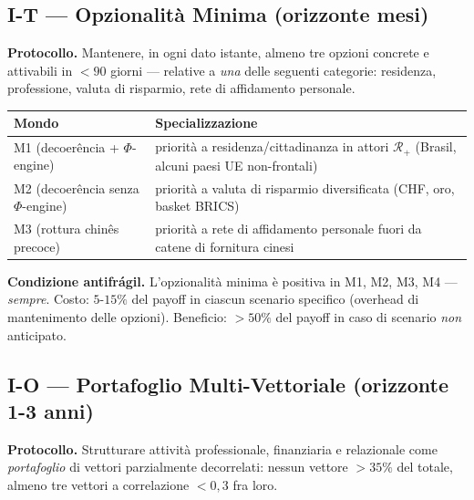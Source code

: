 \subsection{I-T --- Opzionalità Minima (orizzonte
mesi)}\label{i-t-opzionalituxe0-minima-orizzonte-mesi}

\Hypoth{} \textbf{Protocollo.} Mantenere, in ogni dato istante, almeno
tre opzioni concrete e attivabili in \(< 90\) giorni --- relative a
\emph{una} delle seguenti categorie: residenza, professione, valuta di
risparmio, rete di affidamento personale.

{\def\LTcaptype{none} %
{\small\begin{longtable}[]{@{}
  >{\raggedright\arraybackslash}p{}
  >{\raggedright\arraybackslash}p{}@{}}
\toprule\noalign{}
\begin{minipage}[b]{\linewidth}\raggedright
Mondo
\end{minipage} & \begin{minipage}[b]{\linewidth}\raggedright
Specializzazione
\end{minipage} \\
\midrule\noalign{}
\endhead
\bottomrule\noalign{}
\endlastfoot
M1 (decoerência + $\Phi$-engine) & priorità a residenza/cittadinanza in attori
\(\mathcal{R}_+\) (Brasil, alcuni paesi UE non-frontali) \\
M2 (decoerência senza $\Phi$-engine) & priorità a valuta di risparmio
diversificata (CHF, oro, basket BRICS) \\
M3 (rottura chinês precoce) & priorità a rete di affidamento personale
fuori da catene di fornitura cinesi \\
\end{longtable}}
}

\Proved{} \textbf{Condizione antifrágil.} L'opzionalità minima è
positiva in M1, M2, M3, M4 --- \emph{sempre}. Costo: \(5\)-\(15\%\) del
payoff in ciascun scenario specifico (overhead di mantenimento delle
opzioni). Beneficio: \(> 50\%\) del payoff in caso di scenario
\emph{non} anticipato.

\subsection{I-O --- Portafoglio Multi-Vettoriale (orizzonte 1-3
anni)}\label{i-o-portafoglio-multi-vettoriale-orizzonte-1-3-anni}

\Hypoth{} \textbf{Protocollo.} Strutturare attività professionale,
finanziaria e relazionale come \emph{portafoglio} di vettori
parzialmente decorrelati: nessun vettore \(> 35\%\) del totale, almeno
tre vettori a correlazione \(< 0{,}3\) fra loro.

